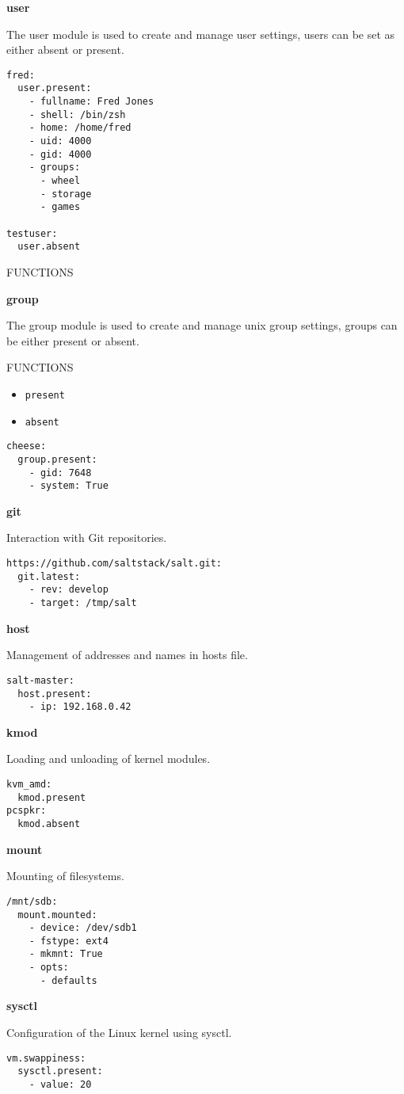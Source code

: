 \documentclass[landscape,a4paper,10pt]{article}
\begin{document}
\begin{multicols}{3}
\bfseries{\LARGE{user}}

The user module is used to create and manage user settings, users can be set as either absent or present.

\begin{verbatim}
fred:
  user.present:
    - fullname: Fred Jones
    - shell: /bin/zsh
    - home: /home/fred
    - uid: 4000
    - gid: 4000
    - groups:
      - wheel
      - storage
      - games

testuser:
  user.absent
\end{verbatim}

FUNCTIONS

\bfseries{\LARGE{group}}

The group module is used to create and manage unix group settings, groups can be either present or absent.

FUNCTIONS

\begin{itemize}
 \item \texttt{present}
 \item \texttt{absent}
\end{itemize}

\begin{verbatim}
cheese:
  group.present:
    - gid: 7648
    - system: True
\end{verbatim}

\bfseries{\LARGE{git}}

Interaction with Git repositories.

\begin{verbatim}
https://github.com/saltstack/salt.git:
  git.latest:
    - rev: develop
    - target: /tmp/salt
\end{verbatim}

\bfseries{\LARGE{host}}

Management of addresses and names in hosts file.

\begin{verbatim}
salt-master:
  host.present:
    - ip: 192.168.0.42
\end{verbatim}

\bfseries{\LARGE{kmod}}

Loading and unloading of kernel modules.

\begin{verbatim}
kvm_amd:
  kmod.present
pcspkr:
  kmod.absent
\end{verbatim}

\bfseries{\LARGE{mount}}

Mounting of filesystems.

\begin{verbatim}
/mnt/sdb:
  mount.mounted:
    - device: /dev/sdb1
    - fstype: ext4
    - mkmnt: True
    - opts:
      - defaults
\end{verbatim}

\bfseries{\LARGE{sysctl}}

Configuration of the Linux kernel using sysctl.

\begin{verbatim}
vm.swappiness:
  sysctl.present:
    - value: 20
\end{verbatim}

\end{multicols}
\end{document}
